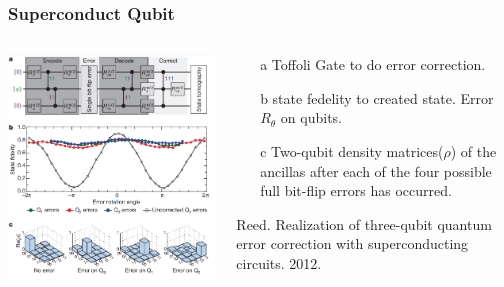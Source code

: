 \documentclass[aspectratio=169,10pt]{beamer}
\begin{document}
\begin{frame}
    \frametitle{Superconduct Qubit}
    \begin{columns}
        \begin{column}{0.45\textwidth}
            \centering
            \includegraphics[width=\columnwidth]{figure/qec3.png}
        \end{column}
        \begin{column}{0.55\textwidth}
            \centering
            \begin{block}{}
                \begin{enumerate}
                    \item[a] Toffoli Gate to do error correction.
                    \item[b] state fedelity to created state. Error $R_\theta$ on qubits.
                    \item[c] Two-qubit density matrices($\rho$) of the ancillas after each of the four possible full bit-flip errors has occurred.
                \end{enumerate}
            \end{block}  
            \tiny{Reed. Realization of three-qubit quantum error correction with superconducting circuits. 2012.}
        \end{column}
    \end{columns}
\end{frame}
\end{document}
